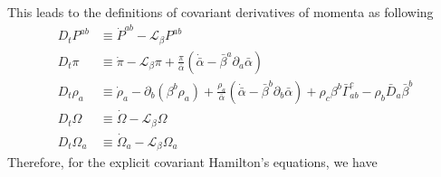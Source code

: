 \documentclass[letterpaper,nofootinbib,prd,amsmath,onecolumn]{revtex4-1}
\begin{document}
This leads to the definitions of covariant derivatives of momenta as following
\begin{subequations}
\begin{align}
D_{t}P^{ab} & \equiv {\dot P}^{ab} - \mathcal{L}_{\beta}P^{ab}\\
D_{t}\pi & \equiv {\dot \pi} - \mathcal{L}_{\beta}\pi + \frac{\pi}{{\bar \alpha}}\left({\dot {\bar \alpha}} - {\bar \beta}^{a}\partial_{a}{\bar \alpha}\right)\\
D_{t}\rho_{a} & \equiv {\dot \rho}_{a} - \partial_{b}\left(\beta^{b}\rho_{a}\right) + \frac{\rho_{a}}{{\bar \alpha}}\left({\dot {\bar \alpha}} - {\bar \beta}^{b}\partial_{b}{\bar \alpha}\right) + \rho_{c}\beta^{b}{\bar \Gamma}^{c}_{ab} - \rho_{b}{\bar D}_{a}{\bar \beta}^{b}\\
D_{t}\Omega & \equiv {\dot \Omega} - \mathcal{L}_{\beta}\Omega\\
D_{t}\Omega_{a} & \equiv {\dot \Omega}_{a} - \mathcal{L}_{\beta}\Omega_{a}
\end{align}
\end{subequations}
Therefore, for the explicit covariant Hamilton's equations, we have
\end{document}
